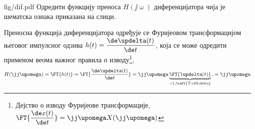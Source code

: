 
\noindent
\mnImportant 
\begin{slikaDesno}{fig/dif.pdf}
    \PID \label{z:dif_pf}
    Одредити функцију преноса $H(\jj\upomega)$ диференцијатора чија је 
    шематска ознака приказана на слици. 
\end{slikaDesno}

%     

\RESENJE

Преносна функција диференцијатора одређује се Фуријеовом трансформацијом његовог импулсног одзива 
$h(t) = \dfrac{\de \updelta(t)}{\de t}$, која се може одредити применом веома важног правила о 
изводу\footnote{Дејство о изводу Фуријеове трансформације, 
$\FT{ \dfrac{ \de x(t)}{\de t}} = \jj\upomega X(\jj\upomega)$
},
\begin{equation}
    H(\jj\upomega) = \FT{h(t)} = \FT{\dfrac{\de \updelta(t)}{\de t}}
    = \jj\upomega \underbrace{ \FT{\updelta(t)} }_{=1, \text{\reft{T:ctft:delta}}}. = \jj\upomega
\end{equation}